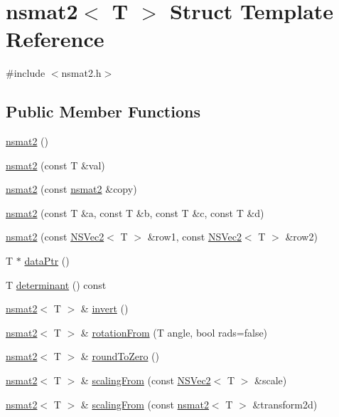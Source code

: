 \hypertarget{structnsmat2}{\section{nsmat2$<$ T $>$ Struct Template Reference}
\label{structnsmat2}
}


{\ttfamily \#include $<$nsmat2.\-h$>$}

\subsection*{Public Member Functions}
\begin{DoxyCompactItemize}
\item 
\hyperlink{structnsmat2_aa6e97d0b8d3f9477cdd86de539a7e78f}{nsmat2} ()
\item 
\hyperlink{structnsmat2_a1a8a3a4f367dcb4b2f881ecd312c6fab}{nsmat2} (const T \&val)
\item 
\hyperlink{structnsmat2_a36ccd82983082044f1940c984751132c}{nsmat2} (const \hyperlink{structnsmat2}{nsmat2} \&copy)
\item 
\hyperlink{structnsmat2_a2199129a77fab38c44061784314b6588}{nsmat2} (const T \&a, const T \&b, const T \&c, const T \&d)
\item 
\hyperlink{structnsmat2_aaae3f17fab7c1c846e9acc7ae6b1b5f0}{nsmat2} (const \hyperlink{structNSVec2}{N\-S\-Vec2}$<$ T $>$ \&row1, const \hyperlink{structNSVec2}{N\-S\-Vec2}$<$ T $>$ \&row2)
\item 
T $\ast$ \hyperlink{structnsmat2_a0332188d2bbdc8366d4f8948e01e16a8}{data\-Ptr} ()
\item 
T \hyperlink{structnsmat2_a5ff3e1c4748cbd07277433e6dc8687e5}{determinant} () const 
\item 
\hyperlink{structnsmat2}{nsmat2}$<$ T $>$ \& \hyperlink{structnsmat2_ae337a477f8a4e897263dbc12324959e1}{invert} ()
\item 
\hyperlink{structnsmat2}{nsmat2}$<$ T $>$ \& \hyperlink{structnsmat2_aae0411dfb6ddaa8925ef80341b5bb814}{rotation\-From} (T angle, bool rads=false)
\item 
\hyperlink{structnsmat2}{nsmat2}$<$ T $>$ \& \hyperlink{structnsmat2_a68458993a2b569fc666dcd93a72b8de0}{round\-To\-Zero} ()
\item 
\hyperlink{structnsmat2}{nsmat2}$<$ T $>$ \& \hyperlink{structnsmat2_a6b22f844975d5791f55cc86deba38a3c}{scaling\-From} (const \hyperlink{structNSVec2}{N\-S\-Vec2}$<$ T $>$ \&scale)
\item 
\hyperlink{structnsmat2}{nsmat2}$<$ T $>$ \& \hyperlink{structnsmat2_afc982fea7fd3878cebb85d59d2bdc216}{scaling\-From} (const \hyperlink{structnsmat2}{nsmat2}$<$ T $>$ \&transform2d)

\end{DoxyCompactItemize}

